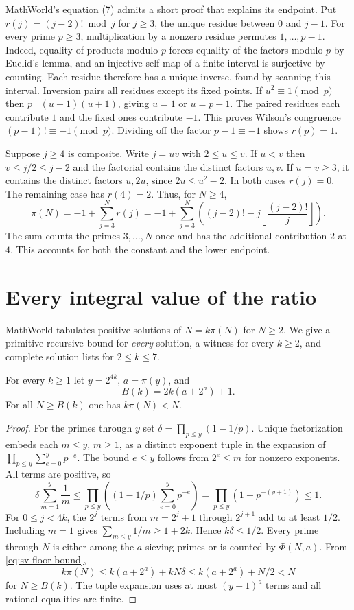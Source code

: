 MathWorld's equation (7) admits a short proof that explains its endpoint. Put $r(j)=(j-2)!\bmod j$ for $j\ge3$, the unique residue between $0$ and $j-1$. For every prime $p\ge3$, multiplication by a nonzero residue permutes $1,\ldots,p-1$. Indeed, equality of products modulo $p$ forces equality of the factors modulo $p$ by Euclid's lemma, and an injective self-map of a finite interval is surjective by counting. Each residue therefore has a unique inverse, found by scanning this interval. Inversion pairs all residues except its fixed points. If $u^2\equiv1\pmod p$ then $p\mid(u-1)(u+1)$, giving $u=1$ or $u=p-1$. The paired residues each contribute $1$ and the fixed ones contribute $-1$. This proves Wilson's congruence $(p-1)!\equiv-1\pmod p$. Dividing off the factor $p-1\equiv-1$ shows $r(p)=1$.

Suppose $j\ge4$ is composite. Write $j=uv$ with $2\le u\le v$. If $u<v$ then $v\le j/2\le j-2$ and the factorial contains the distinct factors $u,v$. If $u=v\ge3$, it contains the distinct factors $u,2u$, since $2u\le u^2-2$. In both cases $r(j)=0$. The remaining case has $r(4)=2$. Thus, for $N\ge4$,
\[
 \pi(N)=-1+\sum_{j=3}^N r(j)
        =-1+\sum_{j=3}^N\left((j-2)!-j\left\lfloor
                       \frac{(j-2)!}{j}\right\rfloor\right).
\]
The sum counts the primes $3,\ldots,N$ once and has the additional contribution $2$ at $4$. This accounts for both the constant and the lower endpoint.

\section{Every integral value of the ratio}
\label{sec:golomb}

MathWorld tabulates positive solutions of $N=k\pi(N)$ for $N\ge2$. We give a primitive-recursive bound for \emph{every} solution, a witness for every $k\ge2$, and complete solution lists for $2\le k\le7$.

\begin{lemma}
For every $k\ge1$ let $y=2^{4k}$, $a=\pi(y)$, and
\[
 B(k)=2k(a+2^a)+1 .
\]
For all $N\ge B(k)$ one has $k\pi(N)<N$.
\end{lemma}
\begin{proof}
For the primes through $y$ set $\delta=\prod_{p\le y}(1-1/p)$. Unique factorization embeds each $m\le y$, $m\ge1$, as a distinct exponent tuple in the expansion of $\prod_{p\le y}\sum_{e=0}^y p^{-e}$. The bound $e\le y$ follows from $2^e\le m$ for nonzero exponents. All terms are positive, so
\[
 \delta\sum_{m=1}^y\frac1m
 \le\prod_{p\le y}\left((1-1/p)\sum_{e=0}^y p^{-e}\right)
 =\prod_{p\le y}(1-p^{-(y+1)})\le1 .
\]
For $0\le j<4k$, the $2^j$ terms from $m=2^j+1$ through $2^{j+1}$ add to at least $1/2$. Including $m=1$ gives $\sum_{m\le y}1/m\ge1+2k$. Hence $k\delta\le1/2$. Every prime through $N$ is either among the $a$ sieving primes or is counted by $\Phi(N,a)$. From \eqref{eq:sv-floor-bound},
\[
 k\pi(N)\le k(a+2^a)+kN\delta\le k(a+2^a)+N/2<N
\]
for $N\ge B(k)$. The tuple expansion uses at most $(y+1)^a$ terms and all rational equalities are finite.
\end{proof}


